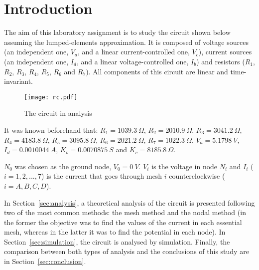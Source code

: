\section{Introduction}
\label{sec:introduction}

\par
The aim of this laboratory assignment is to study the circuit shown below assuming the lumped-elements approximation. It is composed of voltage sources (an independent one, $V_a$, and a linear current-controlled one, $V_c$), current sources (an independent one, $I_d$, and a linear voltage-controlled one, $I_b$) and resistors ($R_1$, $R_2$, $R_3$, $R_4$, $R_5$, $R_6$ and $R_7$). All components of this circuit are linear and time-invariant.

\begin{figure}[h] \centering
\texttt{[image: rc.pdf]}
\caption{The circuit in analysis}
\label{fig:rc}
\end{figure}

\par
It was known beforehand that:
$R_1 = 1039.3 \ \Omega$,
$R_2 = 2010.9 \ \Omega$,
$R_3 = 3041.2 \ \Omega$,
$R_4 = 4183.8 \ \Omega$,
$R_5 = 3095.8 \ \Omega$,
$R_6 = 2021.2 \ \Omega$,
$R_7 = 1022.3 \ \Omega$,
$V_a = 5.1798 \ V$,
$I_d = 0.0010044 \ A$,
$K_b = 0.0070875 \ S$ and
$K_c = 8185.8 \ \Omega$.


\par
$N_0$ was chosen as the ground node, $V_0 = 0 \ V$. $V_i$ is the voltage in node $N_i$ and $I_i$ ($i=1, 2, ..., 7$) is the current that goes through mesh $i$ counterclockwise ($i=A, B, C, D$).

\par
In Section~\ref{sec:analysis}, a theoretical analysis of the circuit is presented following two of the most common methods: the mesh method and the nodal method (in the former the objective was to find the values of the current in each essential mesh, whereas in the latter it was to find the potential in each node). In Section~\ref{sec:simulation}, the circuit is analysed by simulation. Finally, the  comparison between both types of analysis and the conclusions of this study are in Section~\ref{sec:conclusion}.

